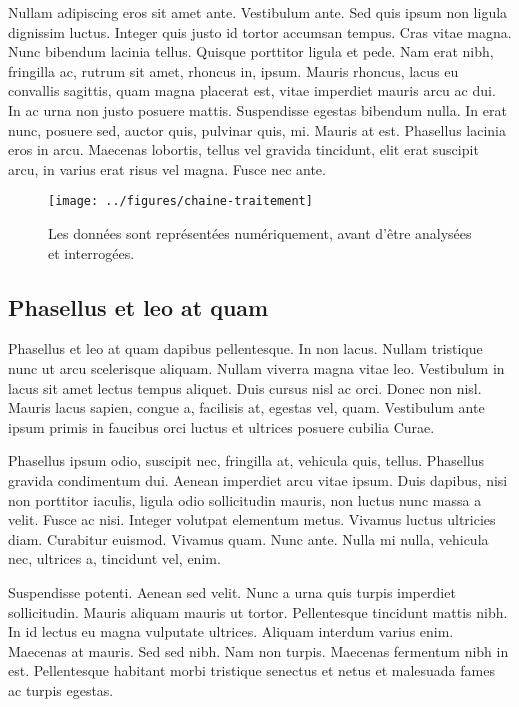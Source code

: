 \documentclass[../hdr.tex]{subfiles}
\begin{document}
Nullam adipiscing eros sit amet ante. Vestibulum ante. Sed quis ipsum non ligula
dignissim luctus. Integer quis justo id tortor accumsan tempus. Cras vitae
magna. Nunc bibendum lacinia tellus. Quisque porttitor ligula et pede. Nam erat
nibh, fringilla ac, rutrum sit amet, rhoncus in, ipsum. Mauris rhoncus, lacus eu
convallis sagittis, quam magna placerat est, vitae imperdiet mauris arcu ac dui.
In ac urna non justo posuere mattis. Suspendisse egestas bibendum nulla. In erat
nunc, posuere sed, auctor quis, pulvinar quis, mi. Mauris at est. Phasellus
lacinia eros in arcu. Maecenas lobortis, tellus vel gravida tincidunt, elit erat
suscipit arcu, in varius erat risus vel magna. Fusce nec ante.

\begin{figure}[htp]
  \centering
\texttt{[image: ../figures/chaine-traitement]}
  \caption[Les données sont représentées numériquement, avant d'être analysées
  et interrogées]{Les données sont représentées numériquement, avant d'être analysées
  et interrogées.}
  \label{chaine-traitement2}
\end{figure}

\subsection{Phasellus et leo at quam}

Phasellus et leo at quam dapibus pellentesque. In non lacus. Nullam tristique
nunc ut arcu scelerisque aliquam. Nullam viverra magna vitae leo. Vestibulum in
lacus sit amet lectus tempus aliquet. Duis cursus nisl ac orci. Donec non nisl.
Mauris lacus sapien, congue a, facilisis at, egestas vel, quam. Vestibulum ante
ipsum primis in faucibus orci luctus et ultrices posuere cubilia Curae.

Phasellus ipsum odio, suscipit nec, fringilla at, vehicula quis, tellus.
Phasellus gravida condimentum dui. Aenean imperdiet arcu vitae ipsum. Duis
dapibus, nisi non porttitor iaculis, ligula odio sollicitudin mauris, non luctus
nunc massa a velit. Fusce ac nisi. Integer volutpat elementum metus. Vivamus
luctus ultricies diam. Curabitur euismod. Vivamus quam. Nunc ante. Nulla mi
nulla, vehicula nec, ultrices a, tincidunt vel, enim.

Suspendisse potenti. Aenean sed velit. Nunc a urna quis turpis imperdiet
sollicitudin. Mauris aliquam mauris ut tortor. Pellentesque tincidunt mattis
nibh. In id lectus eu magna vulputate ultrices. Aliquam interdum varius enim.
Maecenas at mauris. Sed sed nibh. Nam non turpis. Maecenas fermentum nibh in
est. Pellentesque habitant morbi tristique senectus et netus et malesuada fames
ac turpis egestas.
\end{document}
